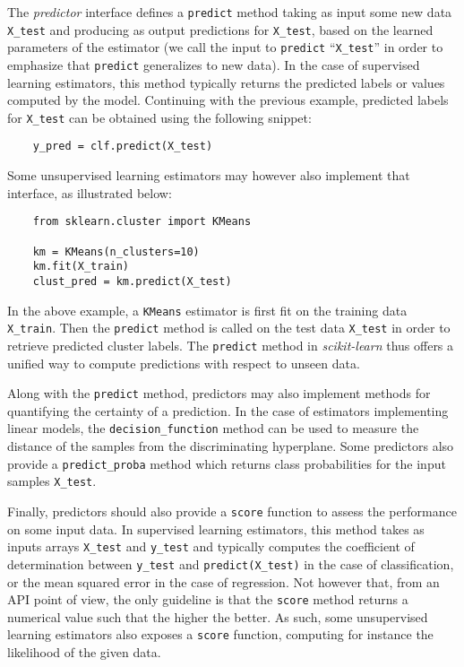 \documentclass{llncs}
\newcommand{\sklearn}{\textit{scikit-learn}\xspace}
\begin{document}
The \textit{predictor} interface defines a \texttt{predict}
method taking as input some new data \texttt{X\_test} and producing as output
predictions for \texttt{X\_test}, based on the learned parameters of the
estimator (we call the input to \texttt{predict} ``\texttt{X\_test}'' in order
to emphasize that \texttt{predict} generalizes to new data). In the case of
supervised learning estimators, this method typically returns the predicted
labels or values computed by the model.  Continuing with the previous example,
predicted labels for \texttt{X\_test} can be obtained using the following
snippet:
\begin{verbatim}
    y_pred = clf.predict(X_test)
\end{verbatim}
Some unsupervised learning
estimators may however also implement that interface, as illustrated below:
\begin{verbatim}
    from sklearn.cluster import KMeans

    km = KMeans(n_clusters=10)
    km.fit(X_train)
    clust_pred = km.predict(X_test)
\end{verbatim}
In the above example, a \texttt{KMeans} estimator is first fit on the training
data \texttt{X\_train}. Then the \texttt{predict} method is called on the test
data \texttt{X\_test} in order to retrieve predicted cluster labels.
The \texttt{predict} method in \sklearn thus offers a unified way
to compute predictions with respect to unseen data.

Along with the \texttt{predict} method, predictors may also implement methods
for quantifying the certainty of a prediction. In the case of estimators
implementing linear models, the \texttt{decision\_function} method can be used
to measure the distance of the samples from the discriminating hyperplane. Some
predictors also provide a \texttt{predict\_proba} method which returns
class probabilities for the input samples \texttt{X\_test}.

Finally, predictors should also provide a \texttt{score} function to assess the
performance on some input data. In supervised learning estimators, this method
takes as inputs arrays \texttt{X\_test} and \texttt{y\_test} and typically
computes the coefficient of determination between \texttt{y\_test} and
\texttt{predict(X\_test)} in the case of classification, or the mean squared
error in the case of regression. Not however that, from an API point of view,
the only guideline is that the \texttt{score} method returns a numerical value
such that the higher the better. As such, some unsupervised learning estimators
also exposes a \texttt{score} function, computing for instance the likelihood of
the given data.
\end{document}
